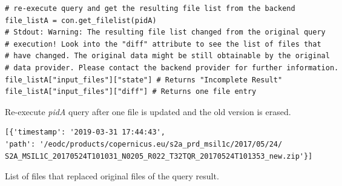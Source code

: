 \documentclass[draft,final]{vutinfth} %
\newenvironment{code}{\captionsetup{type=listing}}{}
\begin{document}
\begin{enumerate}
\begin{code}
		\begin{verbatim}
# re-execute query and get the resulting file list from the backend
file_listA = con.get_filelist(pidA)
# Stdout: Warning: The resulting file list changed from the original query
# execution! Look into the "diff" attribute to see the list of files that
# have changed. The original data might be still obtainable by the original 
# data provider. Please contact the backend provider for further information.
file_listA["input_files"]["state"] # Returns "Incomplete Result"
file_listA["input_files"]["diff"] # Returns one file entry
		\end{verbatim}
		\caption{Re-execute \textit{pidA} query after one file is updated and the old version is erased.}
		\label{lst:eva_datachange_7}
	\end{code}	
	
	\begin{code}
		\begin{verbatim} 
[{'timestamp': '2019-03-31 17:44:43', 
'path': '/eodc/products/copernicus.eu/s2a_prd_msil1c/2017/05/24/
S2A_MSIL1C_20170524T101031_N0205_R022_T32TQR_20170524T101353_new.zip'}]
		\end{verbatim}
		\caption{List of files that replaced original files of the query result.}
		\label{lst:eva_datachange_state}
	\end{code}


\end{enumerate}
\end{document}

